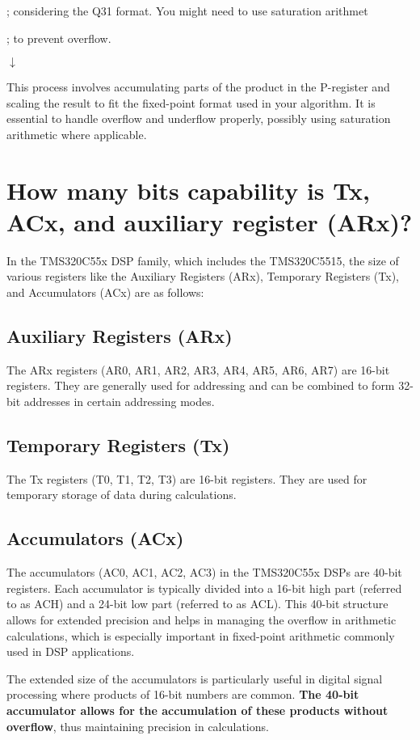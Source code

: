 ; considering the Q31 format. You might need to use saturation arithmet

; to prevent overflow.

$\downarrow$

This process involves accumulating parts of the product in the P-register and scaling the result to fit the fixed-point format used in your algorithm. It is essential to handle overflow and underflow properly, possibly using saturation arithmetic where applicable.

\section{How many bits capability is Tx, ACx, and  auxiliary register (ARx)?}
In the TMS320C55x DSP family, which includes the TMS320C5515, the size of various registers like the Auxiliary Registers (ARx), Temporary Registers (Tx), and Accumulators (ACx) are as follows:
\subsection{Auxiliary Registers (ARx)}
The ARx registers (AR0, AR1, AR2, AR3, AR4, AR5, AR6, AR7) are 16-bit registers. They are generally used for addressing and can be combined to form 32-bit addresses in certain addressing modes.
\subsection{Temporary Registers (Tx)} The Tx registers (T0, T1, T2, T3) are 16-bit registers. They are used for temporary storage of data during calculations.
\subsection{Accumulators (ACx)} The accumulators (AC0, AC1, AC2, AC3) in the TMS320C55x DSPs are 40-bit registers. Each accumulator is typically divided into a 16-bit high part (referred to as ACH) and a 24-bit low part (referred to as ACL). This 40-bit structure allows for extended precision and helps in managing the overflow in arithmetic calculations, which is especially important in fixed-point arithmetic commonly used in DSP applications.

The extended size of the accumulators is particularly useful in digital signal processing where products of 16-bit numbers are common. \textbf{The 40-bit accumulator allows for the accumulation of these products without overflow}, thus maintaining precision in calculations.
